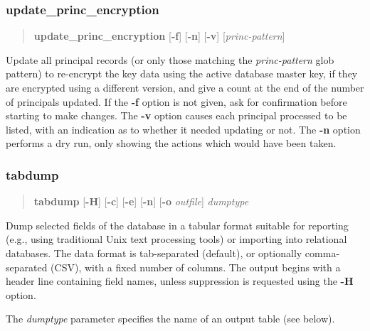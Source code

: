 \documentclass[letterpaper,10pt,english]{sphinxmanual}
\begin{document}
\subsubsection{update\_princ\_encryption}
\label{admin/admin_commands/kdb5_util:update-princ-encryption}\begin{quote}

\textbf{update\_princ\_encryption} {[}\textbf{-f}{]} {[}\textbf{-n}{]} {[}\textbf{-v}{]}
{[}\emph{princ-pattern}{]}
\end{quote}

Update all principal records (or only those matching the
\emph{princ-pattern} glob pattern) to re-encrypt the key data using the
active database master key, if they are encrypted using a different
version, and give a count at the end of the number of principals
updated.  If the \textbf{-f} option is not given, ask for confirmation
before starting to make changes.  The \textbf{-v} option causes each
principal processed to be listed, with an indication as to whether it
needed updating or not.  The \textbf{-n} option performs a dry run, only
showing the actions which would have been taken.


\subsubsection{tabdump}
\label{admin/admin_commands/kdb5_util:tabdump}\begin{quote}

\textbf{tabdump} {[}\textbf{-H}{]} {[}\textbf{-c}{]} {[}\textbf{-e}{]} {[}\textbf{-n}{]} {[}\textbf{-o} \emph{outfile}{]}
\emph{dumptype}
\end{quote}

Dump selected fields of the database in a tabular format suitable for
reporting (e.g., using traditional Unix text processing tools) or
importing into relational databases.  The data format is tab-separated
(default), or optionally comma-separated (CSV), with a fixed number of
columns.  The output begins with a header line containing field names,
unless suppression is requested using the \textbf{-H} option.

The \emph{dumptype} parameter specifies the name of an output table (see
below).
\end{document}
